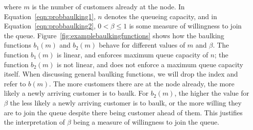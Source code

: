 \documentclass{article}
\begin{document}
where $m$ is the number of customers already at the node.
In Equation~\ref{eqn:probbaulking1}, $n$ denotes the queueing capacity, and in Equation~\ref{eqn:probbaulking2}, $0 < \beta \leq 1$ is some measure of willingness to join the queue.
Figure~\ref{fig:examplebaulkingfunctions} shows how the baulking functions $b_1(m)$ and $b_2(m)$ behave for different values of $m$ and $\beta$.
The function $b_1(m)$ is linear, and enforces maximum queue capacity of $n$; the function $b_2(m)$ is not linear, and does not enforce a maximum queue capacity itself.
When discussing general baulking functions, we will drop the index and refer to $b(m)$.
The more customers there are at the node already, the more likely a newly arriving customer is to baulk.
For $b_2(m)$, the higher the value for $\beta$ the less likely a newly arriving customer is to baulk, or the more willing they are to join the queue despite there being customer ahead of them.
This justifies the interpretation of $\beta$ being a measure of willingness to join the queue.
\end{document}
